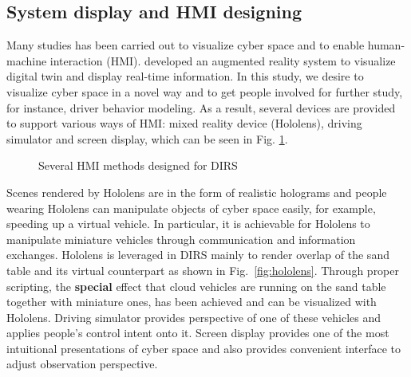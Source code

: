 \documentclass[conference]{IEEEtran}
\begin{document}
\subsection{System display and HMI designing}
	\label{subsec:hmi}
	Many studies has been carried out to visualize cyber space and to enable human-machine interaction (HMI). \cite{ref:meth1} developed an augmented reality system to visualize digital twin and display real-time information. In this study, we desire to visualize cyber space in a novel way and to get people involved for further study, for instance, driver behavior modeling. As a result, several devices are provided to support various ways of HMI: mixed reality device (Hololens), driving simulator and screen display, which can be seen in Fig. \ref{fig:hmi}.
	\begin{figure}[htbp]
	\begin{centering}
	\end{centering}
	\caption {Several HMI methods designed for DIRS}
	\label{fig:hmi}
	\end{figure}
	
	Scenes rendered by Hololens are in the form of realistic holograms and people wearing Hololens can manipulate objects of cyber space easily, for example, speeding up a virtual vehicle. In particular, it is achievable for Hololens to manipulate miniature vehicles through communication and information exchanges. Hololens is leveraged in DIRS mainly to render overlap of the sand table and its virtual counterpart as shown in Fig.~\ref{fig:hololens}. Through proper scripting, the \textbf{special} effect that cloud vehicles are running on the sand table together with miniature ones, has been achieved and can be visualized with Hololens. Driving simulator provides perspective of one of these vehicles and applies people's control intent onto it. Screen display provides one of the most intuitional presentations of cyber space and also provides convenient interface to adjust observation perspective.
\end{document}
